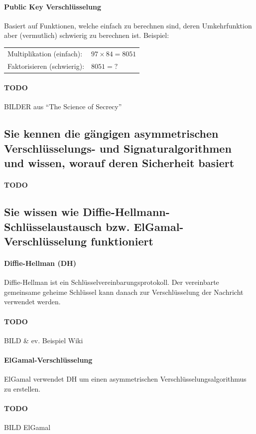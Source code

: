 \documentclass[10pt,a4paper]{article}
\begin{document}
\paragraph*{Public Key Verschlüsselung}Basiert auf Funktionen, welche einfach zu berechnen sind, deren Umkehrfunktion aber (vermutlich) schwierig zu berechnen ist.
Beispiel:\newline
\noindent
\begin{tabular}{|ll|}
    \hline
    Multiplikation (einfach):&$97\times84=8051$\\
    Faktorisieren (schwierig):&$8051=?$\\
    \hline
\end{tabular}
\paragraph*{TODO}BILDER aus "`The Science of Secrecy"'
\subsection*{Sie kennen die gängigen asymmetrischen Verschlüsselungs- und Signaturalgorithmen und wissen, worauf deren Sicherheit basiert}
\paragraph*{TODO}
\subsection*{Sie wissen wie Diffie-Hellmann-Schlüsselaustausch bzw. ElGamal-Verschlüsselung funktioniert}
\paragraph*{Diffie-Hellman (DH)}Diffie-Hellman ist ein Schlüsselvereinbarungsprotokoll. Der vereinbarte gemeinsame geheime Schlüssel kann danach zur Verschlüsselung der Nachricht verwendet werden.
\paragraph*{TODO}BILD \& ev. Beispiel Wiki
\paragraph*{ElGamal-Verschlüsselung}ElGamal verwendet DH um einen asymmetrischen Verschlüsselungsalgorithmus zu erstellen.
\paragraph*{TODO}BILD ElGamal
\end{document}
